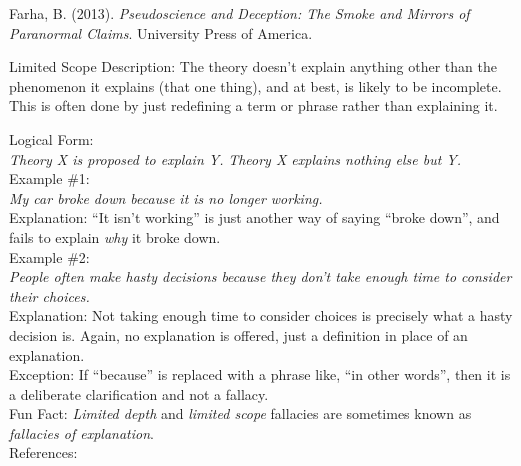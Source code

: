 \documentclass[a4paper,12pt,single,pdftex]{scrartcl}
\begin{document}
      
        
          Farha, B. (2013). {\it Pseudoscience and Deception: The Smoke and Mirrors of Paranormal Claims}. University Press of America.
        
      
    
  

Limited Scope
    Description: The theory doesn't explain anything other than the phenomenon it explains (that one thing), and at best, is likely to be incomplete.  This is often done by just redefining a term or phrase rather than explaining it.

    
      Logical Form:
    \\

    
      {\em Theory X is proposed to explain Y.} \newline
{\em Theory X explains nothing else but Y.}
    \\

    
      Example \#1:
    \\

    
      {\em My car broke down because it is no longer working.}
    \\

    
      Explanation: “It isn’t working” is just another way of saying “broke down”, and fails to explain {\it why} it broke down.
    \\

    
      Example \#2:
    \\

    
      {\em People often make hasty decisions because they don’t take enough time to consider their choices.}
    \\

    
      Explanation: Not taking enough time to consider choices is precisely what a hasty decision is.  Again, no explanation is offered, just a definition in place of an explanation.
    \\

    
      Exception: If “because” is replaced with a phrase like, “in other words”, then it is a deliberate clarification and not a fallacy.
    \\

    
      Fun Fact: {\em {\it Limited depth}} and {\em limited scope}  fallacies are sometimes known as {\em fallacies of explanation}.
    \\

    References:

    
      
\end{document}
